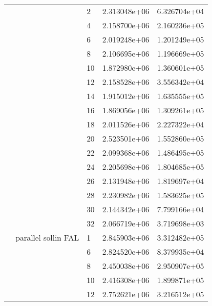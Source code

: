 \begin{tabular}{lllrr}
                      &                     & 2  &  2.313048e+06 &  6.326704e+04 \\
                      &                     & 4  &  2.158700e+06 &  2.160236e+05 \\
                      &                     & 6  &  2.019248e+06 &  1.201249e+05 \\
                      &                     & 8  &  2.106695e+06 &  1.196669e+05 \\
                      &                     & 10 &  1.872980e+06 &  1.360601e+05 \\
                      &                     & 12 &  2.158528e+06 &  3.556342e+04 \\
                      &                     & 14 &  1.915012e+06 &  1.635555e+05 \\
                      &                     & 16 &  1.869056e+06 &  1.309261e+05 \\
                      &                     & 18 &  2.011526e+06 &  2.227322e+04 \\
                      &                     & 20 &  2.523501e+06 &  1.552860e+05 \\
                      &                     & 22 &  2.099368e+06 &  1.486495e+05 \\
                      &                     & 24 &  2.205698e+06 &  1.804685e+05 \\
                      &                     & 26 &  2.131948e+06 &  1.819697e+04 \\
                      &                     & 28 &  2.230982e+06 &  1.583625e+05 \\
                      &                     & 30 &  2.144342e+06 &  7.799166e+04 \\
                      &                     & 32 &  2.066719e+06 &  3.719698e+03 \\
                      & parallel sollin FAL & 1  &  2.845903e+06 &  3.312482e+05 \\
                      &                     & 6  &  2.824520e+06 &  8.379935e+04 \\
                      &                     & 8  &  2.450038e+06 &  2.950907e+05 \\
                      &                     & 10 &  2.416308e+06 &  1.899871e+05 \\
                      &                     & 12 &  2.752621e+06 &  3.216512e+05 \\

\end{tabular}

